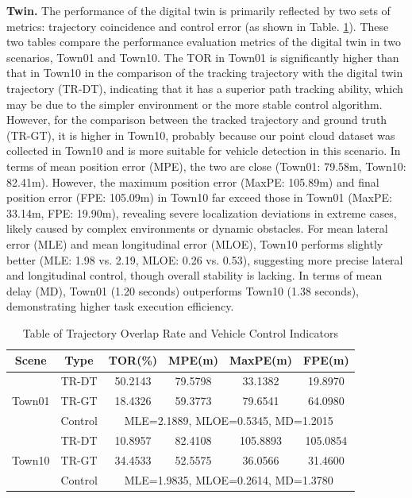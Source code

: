 \documentclass[lettersize,journal]{IEEEtran}
\begin{document}
\textbf{Twin.}
The performance of the digital twin is primarily reflected by two sets of metrics: trajectory coincidence and control error (as shown in Table. \ref{tab:3}). 
These two tables compare the performance evaluation metrics of the digital twin in two scenarios, Town01 and Town10. 
The TOR in Town01 is significantly higher than that in Town10 in the comparison of the tracking trajectory with the digital twin trajectory (TR-DT), indicating that it has a superior path tracking ability, which may be due to the simpler environment or the more stable control algorithm.
However, for the comparison between the tracked trajectory and ground truth (TR-GT), it is higher in Town10, probably because our point cloud dataset was collected in Town10 and is more suitable for vehicle detection in this scenario.
In terms of mean position error (MPE), the two are close (Town01: 79.58m, Town10: 82.41m). 
However, the maximum position error (MaxPE: 105.89m) and final position error (FPE: 105.09m) in Town10 far exceed those in Town01 (MaxPE: 33.14m, FPE: 19.90m), revealing severe localization deviations in extreme cases, likely caused by complex environments or dynamic obstacles. 
For mean lateral error (MLE) and mean longitudinal error (MLOE), Town10 performs slightly better (MLE: 1.98 vs. 2.19, MLOE: 0.26 vs. 0.53), suggesting more precise lateral and longitudinal control, though overall stability is lacking. 
In terms of mean delay (MD), Town01 (1.20 seconds) outperforms Town10 (1.38 seconds), demonstrating higher task execution efficiency.


\begin{table}[t]
	\centering
	\caption{Table of Trajectory Overlap Rate and Vehicle Control Indicators}
	\label{tab:3}
	 \renewcommand\arraystretch{1.3}
	\begin{tabular}{|c|c|c|c|c|c|}

		\hline
		Scene & Type & TOR(\%) & MPE(m) & MaxPE(m) & FPE(m) \\
		\hline
		\multirow{3}{*}{Town01} & TR-DT & 50.2143 & 79.5798 & 33.1382 & 19.8970 \\
		\cline{2-6}
		& TR-GT & 18.4326 & 59.3773 & 79.6541 & 64.0980 \\
        \cline{2-6}
        & Control & \multicolumn{4}{|c|}{MLE=2.1889, MLOE=0.5345, MD=1.2015} \\
		\hline
		\multirow{3}{*}{Town10} & TR-DT & 10.8957 & 82.4108 & 105.8893 & 105.0854 \\
		\cline{2-6}
		& TR-GT & 34.4533 & 52.5575 & 36.0566 & 31.4600 \\
		\cline{2-6}
		& Control & \multicolumn{4}{|c|}{MLE=1.9835, MLOE=0.2614, MD=1.3780} \\	
		\hline
	\end{tabular}
\end{table}
\end{document}
